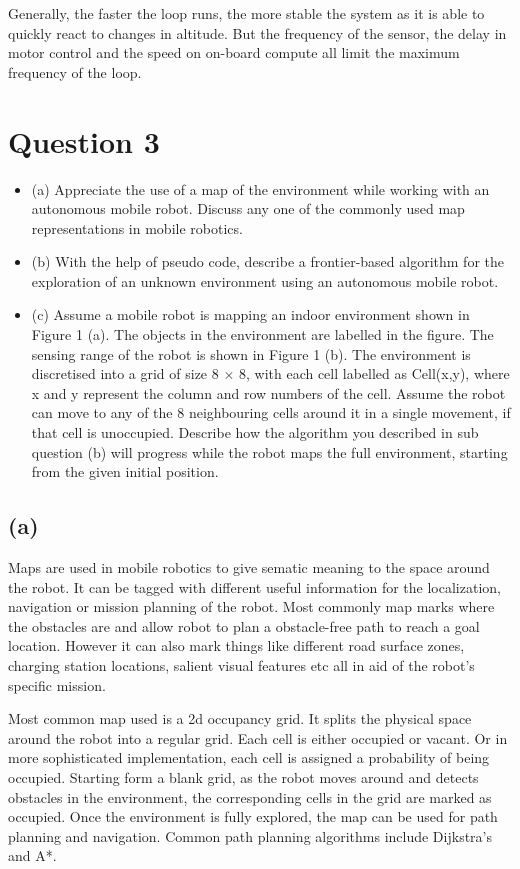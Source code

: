 \documentclass{report}
\begin{document}
Generally, the faster the loop runs, the more stable the system as it is able to quickly react to changes in altitude. But the frequency of the sensor, the delay in motor control and the speed on on-board compute all limit the maximum frequency of the loop.

\chapter{Question 3}

\begin{itemize}
    \item (a) Appreciate the use of a map of the environment while working with an autonomous mobile robot. Discuss
    any one of the commonly used map representations in mobile robotics.
    \item (b) With the help of pseudo code, describe a frontier-based algorithm for the exploration of an unknown
    environment using an autonomous mobile robot.
    \item (c) Assume a mobile robot is mapping an indoor environment shown in Figure 1 (a). The objects in the
    environment are labelled in the figure. The sensing range of the robot is shown in Figure 1 (b). The
    environment is discretised into a grid of size 8 × 8, with each cell labelled as Cell(x,y), where x and y represent
    the column and row numbers of the cell. Assume the robot can move to any of the 8 neighbouring cells
    around it in a single movement, if that cell is unoccupied. Describe how the algorithm you described in sub
    question (b) will progress while the robot maps the full environment, starting from the given initial position.
\end{itemize}

\section{(a)}

Maps are used in mobile robotics to give sematic meaning to the space around the robot. It can be tagged with different useful information for the localization, navigation or mission planning of the robot. Most commonly map marks where the obstacles are and allow robot to plan a obstacle-free path to reach a goal location. However it can also mark things like different road surface zones, charging station locations, salient visual features etc all in aid of the robot's specific mission.

Most common map used is a 2d occupancy grid. It splits the physical space around the robot into a regular grid. Each cell is either occupied or vacant. Or in more sophisticated implementation, each cell is assigned a probability of being occupied. Starting form a blank grid, as the robot moves around and detects obstacles in the environment, the corresponding cells in the grid are marked as occupied. Once the environment is fully explored, the map can be used for path planning and navigation. Common path planning algorithms include Dijkstra’s and A*.
\end{document}
